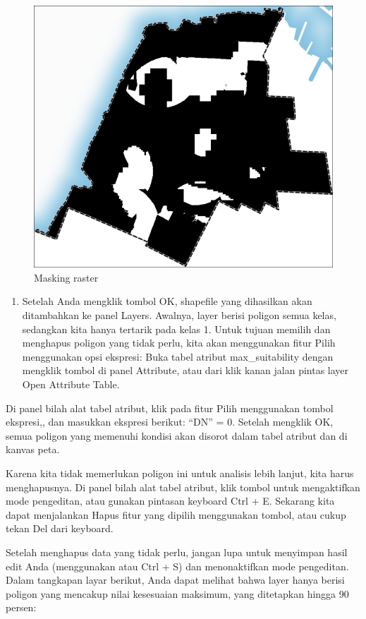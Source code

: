 \documentclass[]{book}
\providecommand{\tightlist}{%
  \setlength{\itemsep}{0pt}\setlength{\parskip}{0pt}}
\begin{document}
\begin{figure}

{\centering \includegraphics[width=0.7\linewidth]{images/04/fig44} 

}

\caption{Masking raster}\label{fig:fig1444}
\end{figure}

\begin{enumerate}
\def\labelenumi{\arabic{enumi}.}
\setcounter{enumi}{2}
\tightlist
\item
  Setelah Anda mengklik tombol OK, shapefile yang dihasilkan akan ditambahkan ke panel Layers. Awalnya, layer berisi poligon semua kelas, sedangkan kita hanya tertarik pada kelas 1. Untuk tujuan memilih dan menghapus poligon yang tidak perlu, kita akan menggunakan fitur Pilih menggunakan opsi ekspresi:
  Buka tabel atribut max\_suitability dengan mengklik tombol di panel Attribute, atau dari klik kanan jalan pintas layer Open Attribute Table.
\end{enumerate}

Di panel bilah alat tabel atribut, klik pada fitur Pilih menggunakan tombol ekspresi,, dan masukkan ekspresi berikut: ``DN'' = 0. Setelah mengklik OK, semua poligon yang memenuhi kondisi akan disorot dalam tabel atribut dan di kanvas peta.

Karena kita tidak memerlukan poligon ini untuk analisis lebih lanjut, kita harus menghapusnya. Di panel bilah alat tabel atribut, klik tombol untuk mengaktifkan mode pengeditan, atau gunakan pintasan keyboard Ctrl + E. Sekarang kita dapat menjalankan Hapus fitur yang dipilih menggunakan tombol, atau cukup tekan Del dari keyboard.

Setelah menghapus data yang tidak perlu, jangan lupa untuk menyimpan hasil edit Anda (menggunakan atau Ctrl + S) dan menonaktifkan mode pengeditan. Dalam tangkapan layar berikut, Anda dapat melihat bahwa layer hanya berisi poligon yang mencakup nilai kesesuaian maksimum, yang ditetapkan hingga 90 persen:
\end{document}
